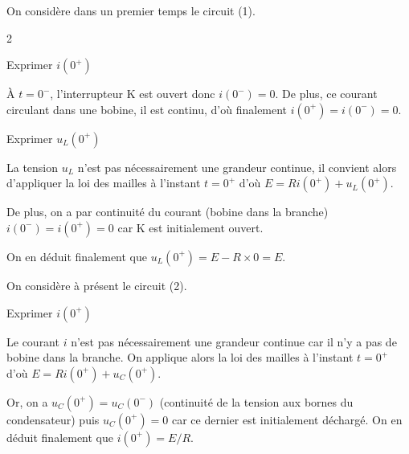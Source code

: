 On considère dans un premier temps le circuit (1). 

\begin{multicols}{2}
\begin{enonce}
Exprimer $i(0^+)$
\end{enonce}


\begin{corrige}
À $t=0^-$, l'interrupteur K est ouvert donc $i(0^-) = 0$. De plus, ce courant circulant dans une bobine, il est continu, d'où finalement $i(0^+) = i(0^-) = 0$.
\end{corrige}




\begin{enonce}
Exprimer $u_L(0^+)$
\end{enonce}


\begin{corrige}
La tension $u_L$ n'est pas nécessairement une grandeur continue, il convient alors d'appliquer la loi des mailles à l'instant $t=0^+$ d'où $E = Ri(0^+) + u_L(0^+)$.
\par
De plus, on a par continuité du courant (bobine dans la branche) $i(0^-) = i(0^+) = 0$ car K est initialement ouvert.
\par
On en déduit finalement que $u_L(0^+) = E - R \times 0 = E$.
\end{corrige}
\end{multicols}



\medskip
On considère à présent le circuit (2). \minusSmallskip

\begin{enonce}
Exprimer $i(0^+)$
\end{enonce}


\begin{corrige}
Le courant $i$ n'est pas nécessairement une grandeur continue car il n'y a pas de bobine dans la branche. On applique alors la loi des mailles à l'instant $t=0^+$ d'où $E = Ri(0^+) + u_C(0^+)$.
\par
Or, on a  $u_C(0^+) = u_C(0^-)$ (continuité de la tension aux bornes du condensateur) puis $u_C(0^+) = 0$ car ce dernier est initialement déchargé. On en déduit finalement que $i(0^+) = E/R$.
\end{corrige}


